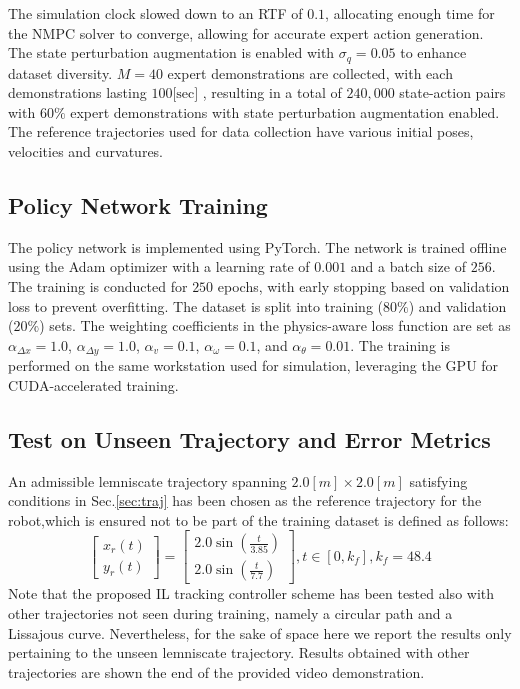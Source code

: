 \documentclass[letterpaper, 10 pt, conference]{ieeeconf}
\begin{document}
The simulation clock slowed down to an RTF of $0.1$, allocating enough time for the NMPC solver to converge, allowing for accurate expert action generation. The state perturbation augmentation is enabled with $\sigma_q=0.05$ to enhance dataset diversity. $M=40$ expert demonstrations are collected, with each demonstrations lasting $100\text{[sec]}$ , resulting in a total of $240,000$ state-action pairs with $60\%$ expert demonstrations with state perturbation augmentation enabled. The reference trajectories used for data collection have various initial poses, velocities and curvatures.

\subsection{Policy Network Training}
The policy network is implemented using PyTorch. The network is trained offline using the Adam optimizer with a learning rate of $0.001$ and a batch size of $256$. The training is conducted for $250$ epochs, with early stopping based on validation loss to prevent overfitting. The dataset is split into training ($80\%$) and validation ($20\%$) sets. The weighting coefficients in the physics-aware loss function are set as $\alpha_{\Delta x}=1.0$, $\alpha_{\Delta y}=1.0$, $\alpha_v=0.1$, $\alpha_{\omega}=0.1$, and $\alpha_{\theta}=0.01$. The training is performed on the same workstation used for simulation, leveraging the GPU for CUDA-accelerated training.

\subsection{Test on Unseen Trajectory and Error Metrics} \label{sec:test-traj_error_index}

An admissible lemniscate trajectory spanning $2.0[m]\times2.0[m]$ satisfying conditions in Sec.\ref{sec:traj} has been chosen as the reference trajectory for the robot,which is ensured not to be part of the training dataset is defined as follows:
\begin{equation}
  \left[
    \begin{array}{l}
      x_r(t) \\
      y_r(t)
  \end{array}\right]=\left[
    \begin{array}{c}
      2.0 \sin \left(\frac{t}{3.85}\right) \\
      2.0 \sin \left(\frac{t}{7.7}\right)
  \end{array}\right], t \in\left[0, k_f\right], k_f=48.4
\end{equation}
%
Note that the proposed IL tracking controller scheme has been tested also with other trajectories not seen during training, namely a circular path and a Lissajous curve. Nevertheless, for the sake of space here we report the results only pertaining to the unseen lemniscate trajectory. Results obtained with other trajectories are shown the end of the provided video demonstration.
\end{document}
